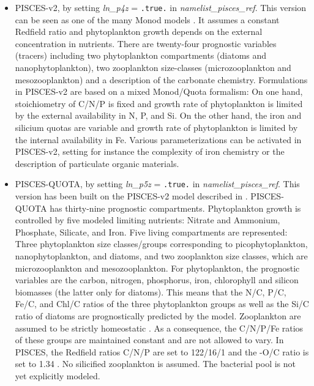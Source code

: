 \documentclass[../main/TOP_manual]{subfiles}
\begin{document}
\begin{itemize}
	\item PISCES-v2, by setting \textit{ln\_p4z} = \texttt{.true.} in \textit{namelist\_pisces\_ref}. This version can be seen as one of the many Monod models \citep{monod_1958}. It assumes a constant Redfield ratio and phytoplankton growth depends on the external concentration in nutrients. There are twenty-four prognostic variables (tracers) including two phytoplankton compartments  (diatoms and nanophytoplankton), two zooplankton size-classes (microzooplankton and  mesozooplankton) and a description of the carbonate chemistry. Formulations in PISCES-v2 are based on a mixed Monod/Quota formalism: On one hand, stoichiometry of C/N/P is fixed and growth rate of phytoplankton is limited by the external availability in N, P, and Si. On the other hand, the iron and silicium quotas are variable and growth rate of phytoplankton is limited by the internal availability in Fe. Various parameterizations can be activated in PISCES-v2, setting for instance the complexity of iron chemistry or the description of particulate organic materials.
	
	\item PISCES-QUOTA, by setting \textit{ln\_p5z} = \texttt{.true.} in \textit{namelist\_pisces\_ref}. This version has been built on the PISCES-v2 model described in \citet{aumont_2015}. PISCES-QUOTA has thirty-nine prognostic compartments. Phytoplankton growth is controlled by five modeled limiting nutrients: Nitrate and Ammonium, Phosphate, Silicate, and Iron. Five living compartments are represented: Three phytoplankton size classes/groups corresponding to picophytoplankton, nanophytoplankton, and diatoms, and two zooplankton size classes, which are microzooplankton and mesozooplankton. For phytoplankton, the prognostic variables are the carbon, nitrogen, phosphorus,  iron, chlorophyll and silicon biomasses (the latter only for diatoms). This means that the N/C, P/C, Fe/C, and Chl/C ratios of the three phytoplankton groups as well as the Si/C ratio of diatoms are prognostically predicted by the model. Zooplankton are assumed to be strictly homeostatic \citep[e.g.,][]{sterner_2003,woods_2013,meunier_2014}. As a consequence, the C/N/P/Fe ratios of these groups are maintained constant and are not allowed to vary. In PISCES, the Redfield ratios C/N/P are set to 122/16/1 \citep{takahashi_1985} and the -O/C ratio is set to 1.34 \citep{kortzinger_2001}. No silicified zooplankton is assumed. The bacterial pool is not yet explicitly modeled.
\end{itemize}
\end{document}
